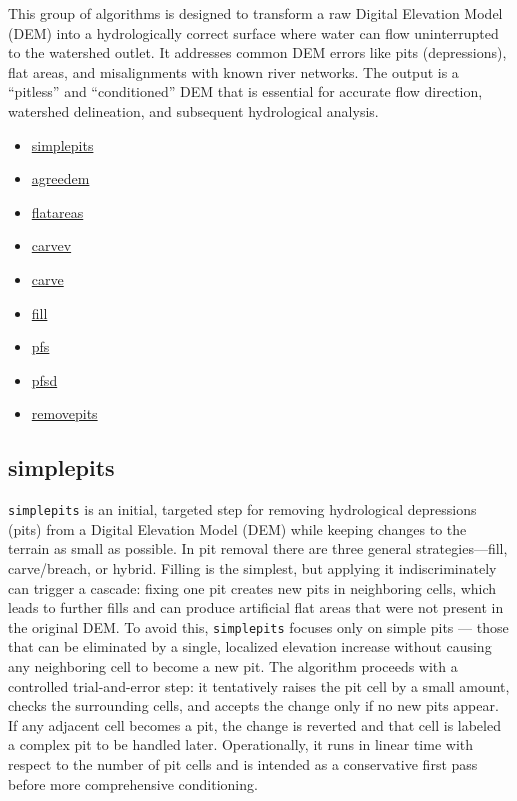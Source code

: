 \documentclass[
]{book}
\providecommand{\tightlist}{%
  \setlength{\itemsep}{0pt}\setlength{\parskip}{0pt}}
\begin{document}
This group of algorithms is designed to transform a raw Digital Elevation Model (DEM) into a hydrologically correct surface where water can flow uninterrupted to the watershed outlet. It addresses common DEM errors like pits (depressions), flat areas, and misalignments with known river networks. The output is a ``pitless'' and ``conditioned'' DEM that is essential for accurate flow direction, watershed delineation, and subsequent hydrological analysis.

\begin{itemize}
\tightlist
\item
  \hyperref[simplepits]{simplepits}
\item
  \hyperref[agreedem]{agreedem}
\item
  \hyperref[flatareas]{flatareas}
\item
  \hyperref[carvev]{carvev}
\item
  \hyperref[carve]{carve}
\item
  \hyperref[fill]{fill}
\item
  \hyperref[pfs]{pfs}
\item
  \hyperref[pfsd]{pfsd}
\item
  \hyperref[removepits]{removepits}
\end{itemize}

\subsection{simplepits}\label{simplepits}

\texttt{simplepits} is an initial, targeted step for removing hydrological depressions (pits) from a Digital Elevation Model (DEM) while keeping changes to the terrain as small as possible. In pit removal there are three general strategies---fill, carve/breach, or hybrid. Filling is the simplest, but applying it indiscriminately can trigger a cascade: fixing one pit creates new pits in neighboring cells, which leads to further fills and can produce artificial flat areas that were not present in the original DEM. To avoid this, \texttt{simplepits} focuses only on simple pits --- those that can be eliminated by a single, localized elevation increase without causing any neighboring cell to become a new pit. The algorithm proceeds with a controlled trial-and-error step: it tentatively raises the pit cell by a small amount, checks the surrounding cells, and accepts the change only if no new pits appear. If any adjacent cell becomes a pit, the change is reverted and that cell is labeled a complex pit to be handled later. Operationally, it runs in linear time with respect to the number of pit cells and is intended as a conservative first pass before more comprehensive conditioning.
\end{document}
